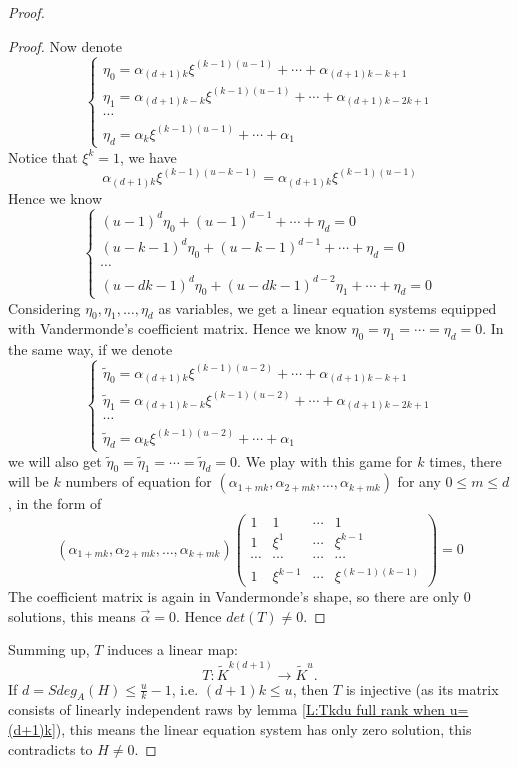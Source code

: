 \documentclass[10pt,a4paper]{amsart}
\begin{document}
\begin{proof}
\begin{proof}
Now denote 
$$
\begin{cases}
\eta_0=\alpha_{(d+1)k}\xi^{(k-1)(u-1)}+\cdots+\alpha_{(d+1)k-k+1}
\\\eta_1=\alpha_{(d+1)k-k}\xi^{(k-1)(u-1)}+\cdots+\alpha_{(d+1)k-2k+1}
\\\cdots
\\\eta_d=\alpha_k\xi^{(k-1)(u-1)}+\cdots+\alpha_1
\end{cases}
$$
Notice that $\xi^k=1$, we have 
$$
\alpha_{(d+1)k}\xi^{(k-1)(u-k-1)}=\alpha_{(d+1)k}\xi^{(k-1)(u-1)}
$$
Hence we know 
$$
\begin{cases}
	(u-1)^d\eta_0+(u-1)^{d-1}+\cdots+\eta_d=0
	\\(u-k-1)^d\eta_0+(u-k-1)^{d-1}+\cdots+\eta_d=0
	\\\cdots
	\\(u-dk-1)^d\eta_0+(u-dk-1)^{d-2}\eta_1+\cdots+\eta_d=0
\end{cases}
$$
Considering $\eta_0,\eta_1,\dots,\eta_d$ as variables, we get a linear equation systems equipped with Vandermonde's coefficient matrix. Hence we know $\eta_0=\eta_1=\cdots=\eta_d=0$. In the same way, if we denote
$$
\begin{cases}
	\tilde{\eta}_0=\alpha_{(d+1)k}\xi^{(k-1)(u-2)}+\cdots+\alpha_{(d+1)k-k+1}
	\\\tilde{\eta}_1=\alpha_{(d+1)k-k}\xi^{(k-1)(u-2)}+\cdots+\alpha_{(d+1)k-2k+1}
	\\\cdots
	\\\tilde{\eta}_d=\alpha_k\xi^{(k-1)(u-2)}+\cdots+\alpha_1
\end{cases}
$$
we will also get $\tilde{\eta}_0=\tilde{\eta}_1=\cdots=\tilde{\eta}_d=0$. We play with this game for $k$ times, there will be $k$ numbers of equation for $(\alpha_{1+mk},\alpha_{2+mk},\dots,\alpha_{k+mk})$ for any $0\leq m\leq d$, in the form of 
$$
(\alpha_{1+mk},\alpha_{2+mk},\dots,\alpha_{k+mk})\begin{pmatrix}
	1 & 1 & \cdots & 1 \\
	1 & \xi^1 & \cdots & \xi^{k-1} \\
	\cdots & \cdots & \cdots & \cdots \\
	1 & \xi^{k-1} & \cdots & \xi^{(k-1)(k-1)}
\end{pmatrix}=0
$$
The coefficient matrix is again in Vandermonde's shape, so there are only $0$ solutions, this means $\overrightarrow{\alpha}=0$. Hence $det(T)\neq 0$.
\end{proof}
   
    
    
	Summing up, $T$ induces a linear map: 
	$$
	T:\tilde{K}^{k(d+1)} \rightarrow \tilde{K}^{u}.
	$$
If $d=Sdeg_A(H)\leq  \frac{u}{k}-1$, i.e. $(d+1)k\leq  u$, then  $T$ is injective (as its matrix consists of linearly independent raws by lemma \ref{L:Tkdu full rank when u=(d+1)k}), this means the linear equation system has  only zero solution, this contradicts to $H\neq 0$.
\end{proof}
\end{document}

